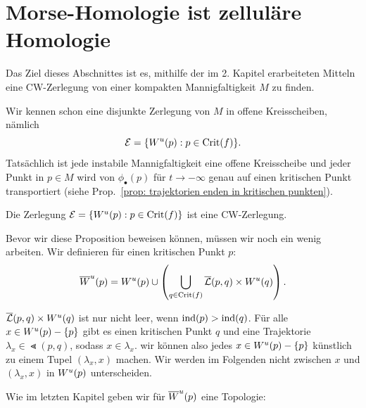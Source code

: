 \section{Morse-Homologie ist zelluläre Homologie}

Das Ziel dieses Abschnittes ist es, mithilfe der im 2. Kapitel erarbeiteten Mitteln eine 
CW-Zerlegung von einer kompakten Mannigfaltigkeit $M$ zu finden.

Wir kennen schon eine disjunkte Zerlegung von $M$ in offene Kreisscheiben, nämlich
\[ \mathcal{E} = \{ { W^u } (p): p \in { \operatorname{Crit} } (f) \} . \]
Tatsächlich ist jede instabile Mannigfaltigkeit eine offene Kreisscheibe und jeder Punkt in 
$ p \in M$ wird von $\phi_{\bullet}(p)$ für $t \to - \infty$ genau auf einen kritischen Punkt 
transportiert (siehe Prop.~\ref{prop: trajektorien enden in kritischen punkten}).

\begin{prop}
    \label{prop: cw-zerlegung}
    Die Zerlegung $\mathcal{E} = \{ { W^u } (p): p \in { \operatorname{Crit} } (f) \}$ ist eine CW-Zerlegung.
\end{prop}

Bevor wir diese Proposition beweisen können, müssen wir noch ein wenig arbeiten.
Wir definieren für einen kritischen Punkt $p$:
\[ { \overline{W}^u } (p) = 
    { W^u } (p) \cup \left( \bigcup_{q \in { \operatorname{Crit} } (f)} {\overline{\mathcal{L}} } (p, q) \times { W^u } (q) \right) . \]

${\overline{\mathcal{L}} } (p, q) \times { W^u } (q)$ ist nur nicht leer, wenn ${ \operatorname{ind} } (p) > { \operatorname{ind} } (q)$.
Für alle $x \in { W^u } (p) - \{ p \}$ gibt es einen kritischen Punkt $q$ und eine Trajektorie 
$\lambda_x \in \Lt (p, q)$, sodass $x \in \lambda_x$. wir können also jedes 
$x \in { W^u } (p) - \{ p \}$ künstlich zu einem Tupel $(\lambda_x, x)$ machen. Wir werden im Folgenden
nicht zwischen $x$ und $(\lambda_x, x)$ in ${ W^u } (p)$ unterscheiden.

Wie im letzten Kapitel geben wir für ${ \overline{W}^u } (p)$ eine Topologie:

